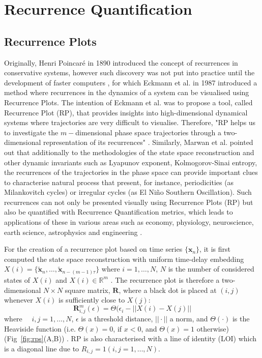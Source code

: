 \documentclass[fleqn,10pt]{wlscirep}
\begin{document}
\section*{Recurrence Quantification}\label{sec:recurrence-quantification}
\subsection*{Recurrence Plots}
Originally, Henri Poincar\'e in 1890 introduced the concept of recurrences 
in conservative systems, however such discovery was not put into practice 
until the development of faster computers \cite{marwan2007},
for which Eckmann et al. \cite{eckmann1987} in 1987 introduced a method
where recurrences in the dynamics of a system can be visualised using 
Recurrence Plots. The intention of Eckmann et al. \cite{eckmann1987} was to 
propose a tool, called Recurrence Plot (RP), that provides insights into 
high-dimensional dynamical systems where trajectories are very difficult to 
visualise. Therefore, "RP helps us to investigate the 
$m-$dimensional phase space trajectories through a two-dimensional 
representation of its recurrences" \cite{marwan2015}.
Similarly, Marwan et al. \cite{marwan2015} pointed out that additionally 
to the methodologies of the state space reconstruction and other dynamic 
invariants such as Lyapunov exponent, Kolmogorov-Sinai entropy, 
the recurrences of the trajectories in the phase space can provide 
important clues to characterise natural process that present, for
instance, periodicities (as Milankovitch cycles) or irregular cycles 
(as El Ni\~no Southern Oscillation). 
Such recurrences can not only be presented visually using Recurrence Plots (RP) 
but also be quantified with Recurrence Quantification metrics, which leads 
to applications of these in various areas such as economy, physiology, 
neuroscience, earth science, astrophysics and engineering \cite{marwan2007}.

For the creation of a recurrence plot based on time series 
$\{ \boldsymbol{x}_n \}$, it is first computed the state space 
reconstruction with uniform time-delay embedding 
$X(i)=\{ \boldsymbol{ \tilde{x} }_n, \dots,  
\boldsymbol{ \tilde{x} }_{n -(m-1)\tau} \}$
where $i=1,\dots,N$, $N$ is the number of considered states of $X(i)$ 
and $X(i) \in \mathbb{R}^m$ \cite{eckmann1987}.
The recurrence plot is therefore a two-dimensional $N \times N$ square 
matrix, $\mathbf{R}$, where a black dot is placed at $(i,j)$ 
whenever $X(i)$ is sufficiently close to $X(j)$: 
\begin{equation}
\mathbf{R}^{m}_{i,j} (\epsilon) = \Theta ( \epsilon_i - || X(i) - X(j) ||
\end{equation}
where $\quad i,j=1,\dots,N$, $\epsilon$ is a threshold distance, 
$|| \cdotp ||$ a norm, and $\Theta(\cdotp)$ is the Heaviside 
function (i.e. $\Theta(x)=0$, if $x<0$, and $\Theta(x)=1$ otherwise) 
(Fig~\ref{fig:rps}(A,B)) \cite{eckmann1987, marwan2007,marwan2015}.
RP is also characterised with a line of identity (LOI) which is a  
diagonal line due to $ R_{i,j}=1 (i,j=1,\dots,N)$. 
\end{document}
